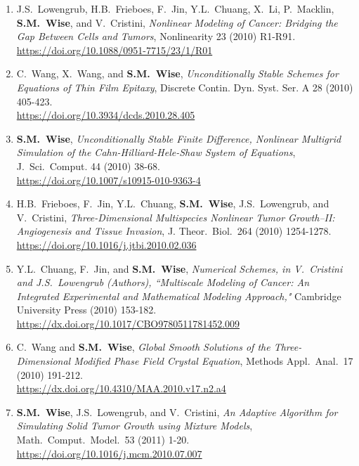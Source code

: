 \documentclass[11pt]{letter}
\begin{document}
\begin{enumerate}
	\item
J.S.~Lowengrub, H.B.~Frieboes, F.~Jin, Y.L.~Chuang, X.~Li, P.~Macklin, \textbf{S.M.~Wise}, and V.~Cristini, {\sl Nonlinear Modeling of Cancer: Bridging the Gap Between Cells and Tumors}, Nonlinearity 23 (2010) R1-R91.
	\\
\url{https://doi.org/10.1088/0951-7715/23/1/R01}

	\item
C.~Wang, X.~Wang, and \textbf{S.M.~Wise}, {\sl Unconditionally Stable Schemes for Equations of Thin Film Epitaxy}, Discrete Contin. Dyn. Syst. Ser. A 28 (2010) 405-423.
	\\
\url{https://doi.org/10.3934/dcds.2010.28.405}

    \item
\textbf{S.M.~Wise}, {\sl Unconditionally Stable Finite Difference, Nonlinear Multigrid Simulation of the Cahn-Hilliard-Hele-Shaw System of Equations}, J.~Sci.~Comput. 44 (2010) 38-68.
	\\
\url{https://doi.org/10.1007/s10915-010-9363-4}
	\item
H.B.~Frieboes, F.~Jin, Y.L.~Chuang, \textbf{S.M.~Wise}, J.S.~Lowengrub, and V.~Cristini, {\sl Three-Dimensional Multispecies Nonlinear Tumor Growth--II: Angiogenesis and Tissue Invasion}, J. Theor.~Biol.~264 (2010) 1254-1278.
	\\
\url{https://doi.org/10.1016/j.jtbi.2010.02.036}

	\item
Y.L.~Chuang, F.~Jin, and \textbf{S.M.~Wise}, {\sl Numerical Schemes, in V.~Cristini and J.S.~Lowengrub (Authors), ``Multiscale Modeling of Cancer: An Integrated Experimental and Mathematical Modeling Approach,"} Cambridge University Press (2010) 153-182.
	\\
\url{https://dx.doi.org/10.1017/CBO9780511781452.009}

	\item
C.~Wang and \textbf{S.M.~Wise}, {\sl Global Smooth Solutions of the Three-Dimensional Modified Phase Field Crystal Equation}, Methods Appl.~Anal.~17 (2010) 191-212.
	\\
\url{https://dx.doi.org/10.4310/MAA.2010.v17.n2.a4}

    \item
\textbf{S.M.~Wise}, J.S.~Lowengrub, and V.~Cristini, {\sl An Adaptive Algorithm for Simulating Solid Tumor Growth using Mixture Models}, Math.~Comput.~Model.~53 (2011) 1-20.
	\\
\url{https://doi.org/10.1016/j.mcm.2010.07.007}
 

\end{enumerate}
\end{document}
